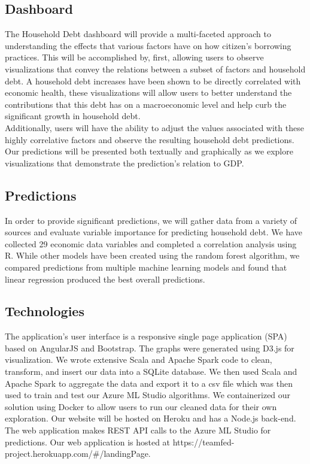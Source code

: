 \documentclass[sigconf,nonacm,11pt]{acmart}
\begin{document}
\subsection{Dashboard}
The Household Debt dashboard will provide a multi-faceted approach to understanding the effects that various factors have on how citizen's borrowing practices.  This will be accomplished by, first, allowing users to observe visualizations that convey the relations between a subset of factors and household debt.  A household debt increases have been shown to be directly correlated with economic health\cite{Mian2015}, these visualizations will allow users to better understand the contributions that this debt has on a macroeconomic level and help curb the significant growth in household debt\cite{Alter2018}.\\
Additionally, users will have the ability to adjust the values associated with these highly correlative factors and observe the resulting household debt predictions.  Our predictions will be presented both textually and graphically as we explore visualizations that demonstrate the prediction's relation to GDP.\vspace{-0.5em}

\subsection{Predictions}

In order to provide significant predictions, we will gather data from a variety of sources and evaluate variable importance for predicting household debt. We have collected 29 economic data variables and completed a correlation analysis using R.  While other models have been created using the random forest algorithm\cite{Nyman2018}, we compared predictions from multiple machine learning models and found that linear regression produced the best overall predictions.\vspace{-0.5em}

\subsection{Technologies}

The application's user interface is a responsive single page application (SPA) based on AngularJS and Bootstrap. The graphs were generated using D3.js for visualization. We wrote extensive Scala and Apache Spark code to clean, transform, and insert our data into a SQLite database. We then used Scala and Apache Spark to aggregate the data and export it to a csv file which was then used to train and test our Azure ML Studio algorithms. We containerized our solution using Docker to allow users to run our cleaned data for their own exploration. Our website will be hosted on Heroku and has a Node.js back-end. The web application makes REST API calls to the Azure ML Studio for predictions. Our web application is hosted at https://teamfed-project.herokuapp.com/\#/landingPage.  
\end{document}
